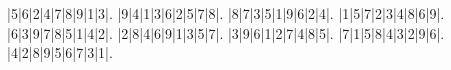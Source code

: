 \begin{sudoku}
|5|6|2|4|7|8|9|1|3|.
|9|4|1|3|6|2|5|7|8|.
|8|7|3|5|1|9|6|2|4|.
|1|5|7|2|3|4|8|6|9|.
|6|3|9|7|8|5|1|4|2|.
|2|8|4|6|9|1|3|5|7|.
|3|9|6|1|2|7|4|8|5|.
|7|1|5|8|4|3|2|9|6|.
|4|2|8|9|5|6|7|3|1|.
\end{sudoku}
